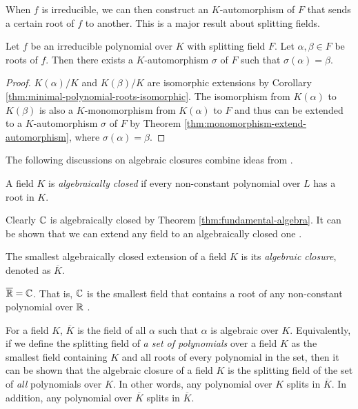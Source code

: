 When $f$ is irreducible, we can then construct an $K$-automorphism of $F$ that sends a certain root of $f$ to another. This is a major result about splitting fields. 

\begin{theorem} \label{thm:automorphism-from-zeros}
	Let $f$ be an irreducible polynomial over $K$ with splitting field $F$. Let $\alpha, \beta \in F$ be roots of $f$. Then there exists a $K$-automorphism $\sigma$ of $F$ such that $\sigma(\alpha) = \beta$. 
\end{theorem}

\begin{proof}
	$K(\alpha)/K$ and $K(\beta)/K$ are isomorphic extensions by Corollary \ref{thm:minimal-polynomial-roots-isomorphic}. The isomorphism from $K(\alpha)$ to $K(\beta)$ is also a $K$-monomorphism from $K(\alpha)$ to $F$ and thus can be extended to a $K$-automorphism $\sigma$ of $F$ by Theorem \ref{thm:monomorphism-extend-automorphism}, where $\sigma(\alpha) = \beta$.
\end{proof}

The following discussions on algebraic closures combine ideas from \cite{galois-theory-lectures, rotman_galois_1998}. 

\begin{definition}
	A field $K$ is \textit{algebraically closed} if every non-constant polynomial over $L$ has a root in $K$. 
\end{definition}

Clearly $\mathbb C$ is algebraically closed by Theorem \ref{thm:fundamental-algebra}. It can be shown that we can extend any field to an algebraically closed one \cite{rotman_galois_1998}. 

\begin{definition}
	The smallest algebraically closed extension of a field $K$ is its \textit{algebraic closure}, denoted as $\overline K$.
\end{definition}

\begin{example}
	$\overline {\mathbb R}  =  \mathbb C$. That is, $\mathbb C$ is the smallest field that contains a root of any non-constant polynomial over $\mathbb R$ \cite{rotman_galois_1998}.
\end{example}


For a field $K$, $\overline K$ is the field of all $\alpha$ such that $\alpha$ is algebraic over $K$. Equivalently, if we define the splitting field of \textit{a set of polynomials} over a field $K$ as the smallest field containing $K$ and all roots of every polynomial in the set, then it can be shown that the algebraic closure of a field $K$ is the splitting field of the set of \textit{all} polynomials over $K$. In other words, any polynomial over $K$ splits in $\overline K$. In addition, any polynomial over $\overline K$ splits in $\overline K$.

